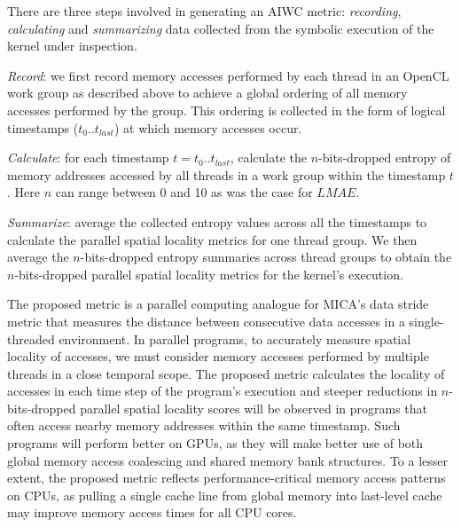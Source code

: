 \documentclass[review=false, sigchi]{acmart}
\begin{document}
	There are three steps involved in generating an AIWC metric: \textit{recording}, \textit{calculating} and \textit{summarizing} data collected from the symbolic execution of the kernel under inspection.
	
	\textit{Record}: we first record memory accesses performed by each thread in an OpenCL work group as described above to achieve a global ordering of all memory accesses performed by the group.
	This ordering is collected in the form of logical timestamps ($t_0 .. t_{last}$) at which memory accesses occur.
	
	\textit{Calculate}: for each timestamp $t = t_0 .. t_{last}$, calculate the $n$-bits-dropped entropy of memory addresses accessed by all threads in a work group within the timestamp $t$. Here $n$ can range between 0 and 10 as was the case for $LMAE$.
	
	\textit{Summarize}: average the collected entropy values across all the timestamps to calculate the parallel spatial locality metrics for one thread group. We then average the $n$-bits-dropped entropy summaries across thread groups to obtain the $n$-bits-dropped parallel spatial locality metrics for the kernel's execution.
	
	

	The proposed metric is a parallel computing analogue for MICA's data stride metric that measures the distance between consecutive data accesses in a single-threaded environment. 
	In parallel programs, to accurately measure spatial locality of accesses, we must consider memory accesses performed by multiple threads in a close temporal scope. 
	The proposed metric calculates the locality of accesses in each time step of the program's execution and steeper reductions in $n$-bits-dropped parallel spatial locality scores will be observed in programs that often access nearby memory addresses within the same timestamp.
	Such programs will perform better on GPUs, as they will make better use of both global memory access coalescing and shared memory bank structures.
	To a lesser extent, the proposed metric reflects performance-critical memory access patterns on CPUs, as pulling a single cache line from global memory into last-level cache may improve memory access times for all CPU cores.
	
\end{document}
